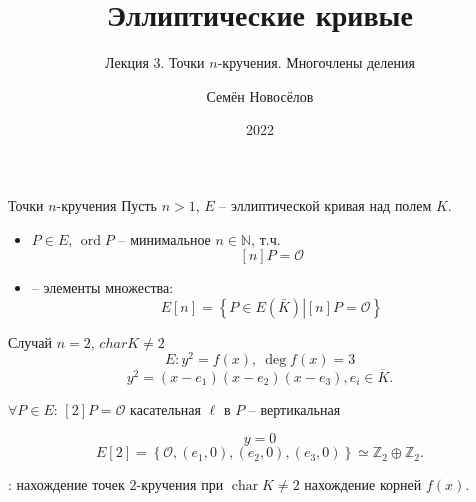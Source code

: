 \documentclass{beamer}
\title{Эллиптические кривые}
\subtitle{Лекция 3. Точки $n$-кручения. Многочлены деления}
\author{Семён Новосёлов}
\institute{БФУ им. И. Канта}
\date{2022}
\begin{document}
\frame{\titlepage}

\begin{frame}{Точки $n$-кручения}
Пусть $n > 1$, $E$ -- эллиптической кривая над полем $K$.
\begin{itemize}
    \item {} $P \in E$, $\operatorname{ord} P$ -- минимальное $n \in \mathbb{N}$, т.ч.
    \[
    [n] P = \mathcal{O}
    \]
    \item {} -- элементы множества:
    \[
    E[n] = \left\{ {\left. P \in E(\bar K)\right| [n]P = \mathcal{O}} \right\}
    \]
\end{itemize}
\end{frame}


\begin{frame}{Случай $n=2$, $charK \ne 2$}
\[
E: {y^2} = f(x), ~ \deg f\left( x \right) = 3
\]
\structure{\[\Downarrow\]}
\[
y^2 = \left( {x - {e_1}} \right)\left( {x - {e_2}} \right)\left( {x - {e_3}} \right), e_i \in \overline{K}.
\]
\begin{center}
$\forall P \in E$: $[2] P = \mathcal{O}$ \structure{$\Leftrightarrow$} касательная $\ell$ в $P$ -- вертикальная
\end{center}
\structure{\[\Downarrow\]}
\[
y = 0
\]
\structure{\[\Downarrow\]}
\[
E[2] = \left\{ \mathcal{O}, (e_1, 0), (e_2 ,0), (e_3,0) \right\} \simeq \mathbb{Z}_2 \oplus \mathbb{Z}_2.
\]
    
: нахождение точек $2$-кручения при $\operatorname{char}K \ne 2$ \structure{$\Leftrightarrow$} нахождение корней $f(x)$.
\end{frame}
\end{document}
